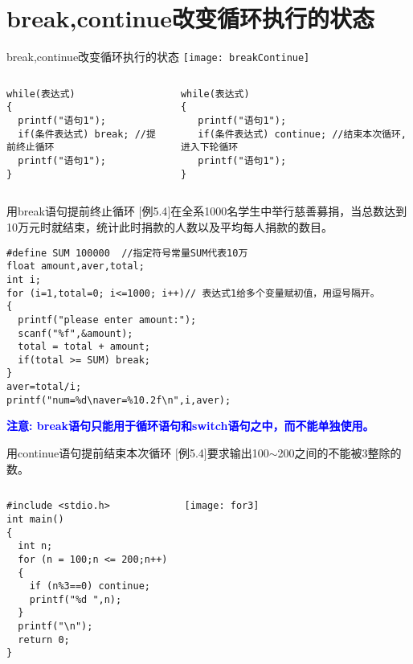 \section{break,continue改变循环执行的状态}

\begin{frame}{break,continue改变循环执行的状态}
\centering
\texttt{[image: breakContinue]}
\begin{columns}[T]
\begin{lstlisting}
while(表达式)
{
  printf("语句1");
  if(条件表达式) break; //提前终止循环
  printf("语句1");
}
\end{lstlisting}
\begin{lstlisting}
while(表达式)
{
   printf("语句1");
   if(条件表达式) continue; //结束本次循环, 进入下轮循环
   printf("语句1");
}
\end{lstlisting}
\end{columns}
\end{frame}

\begin{frame}{用break语句提前终止循环}
$[$例5.4$]$在全系1000名学生中举行慈善募捐，当总数达到10万元时就结束，统计此时捐款的人数以及平均每人捐款的数目。
\begin{lstlisting}
#define SUM 100000  //指定符号常量SUM代表10万
float amount,aver,total; 
int i;
for (i=1,total=0; i<=1000; i++)// 表达式1给多个变量赋初值，用逗号隔开。
{
  printf("please enter amount:");
  scanf("%f",&amount);
  total = total + amount; 
  if(total >= SUM) break; 
}
aver=total/i;
printf("num=%d\naver=%10.2f\n",i,aver); 
\end{lstlisting}
\textbf{\textcolor{blue}{注意: break语句只能用于循环语句和switch语句之中，而不能单独使用。}}
\end{frame}

\begin{frame}{用continue语句提前结束本次循环}
$[$例5.4$]$要求输出100$\sim$200之间的不能被3整除的数。
\begin{columns}
\begin{lstlisting}
#include <stdio.h>
int main()
{
  int n;
  for (n = 100;n <= 200;n++)
  {
    if (n%3==0) continue;
    printf("%d ",n);
  }
  printf("\n");
  return 0;
} 
\end{lstlisting}
\texttt{[image: for3]}
\end{columns}
\end{frame}

